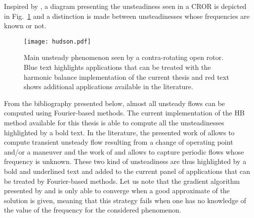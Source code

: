 
Inspired by \citet{Hodson1998},
a diagram presenting the unsteadiness seen in 
a CROR is depicted in Fig.~\ref{fig:hudson} and a distinction
is made between unsteadinesses whose frequencies are
known or not.
\begin{figure}[htbp]
  \centering
  \texttt{[image: hudson.pdf]}
  \caption{Main unsteady phenomenon seen by a contra-rotating
  open rotor. Blue text highlights applications that can
  be treated with the harmonic balance implementation of the
  current thesis and red text shows additional applications
  available in the literature.}
  \label{fig:hudson}
\end{figure}
From the bibliography presented below, almost all
unsteady flows can be computed using Fourier-based methods.
The current implementation of the HB method available for
this thesis is able to compute all the unsteadinesses highlighted
by a bold text. In the literature, the presented work of 
\citet{Mavriplis2012} allows to compute transient unsteady flow
resulting from a change of operating point and/or a maneuver and
the work of \citet{McMullen2002} and \citet{Gopinath2006} allows
to capture periodic flows whose frequency is unknown. These two
kind of unsteadiness are thus highlighted by a bold and underlined
text and added
to the current panel of applications that can
be treated by Fourier-based methods. Let us note
that the gradient algorithm presented by \citet{McMullen2002}
and \citet{Gopinath2006} is only able to converge when a 
good approximate of the solution is given, meaning
that this strategy fails when one has no knowledge
of the value of the frequency for the considered phenomenon.
